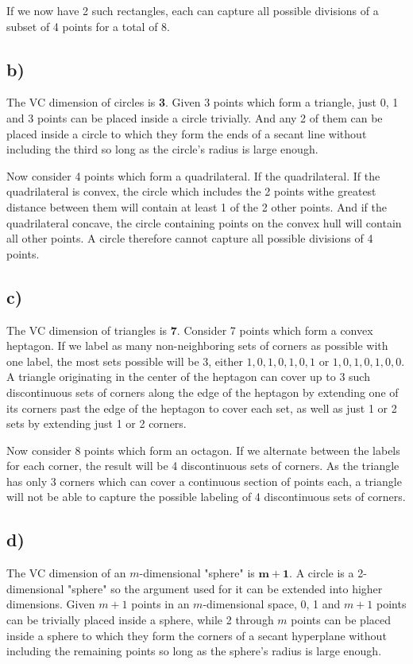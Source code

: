 \documentclass[12pt]{article}
\begin{document}
If we now have 2 such rectangles, each can capture all possible divisions of a subset of 4 points for a total of 8.

\subsection*{b)}
The VC dimension of circles is \textbf{3}. Given 3 points which form a triangle, just 0, 1 and 3 points can be placed inside a circle trivially. And any 2 of them can be placed inside a circle to which they form the ends of a secant line without including the third so long as the circle's radius is large enough.

Now consider 4 points which form a quadrilateral. If the quadrilateral. If the quadrilateral is convex, the circle which includes the 2 points withe greatest distance between them will contain at least 1 of the 2 other points. And if the quadrilateral concave, the circle containing points on the convex hull will contain all other points. A circle therefore cannot capture all possible divisions of 4 points.

\subsection*{c)}
The VC dimension of triangles is \textbf{7}. Consider 7 points which form a convex heptagon. If we label as many non-neighboring sets of corners as possible with one label, the most sets possible will be 3, either $1,0,1,0,1,0,1$ or $1,0,1,0,1,0,0$. A triangle originating in the center of the heptagon can cover up to 3 such discontinuous sets of corners along the edge of the heptagon by extending one of its corners past the edge of the heptagon to cover each set, as well as just 1 or 2 sets by extending just 1 or 2 corners.

Now consider 8 points which form an octagon. If we alternate between the labels for each corner, the result will be 4 discontinuous sets of corners. As the triangle has only 3 corners which can cover a continuous section of points each, a triangle will not be able to capture the possible labeling of 4 discontinuous sets of corners.

\subsection*{d)}
The VC dimension of an $m$-dimensional "sphere" is $\mathbf{m+1}$. A circle is a 2-dimensional "sphere" so the argument used for it can be extended into higher dimensions. Given $m+1$ points in an $m$-dimensional space, 0, 1 and $m+1$ points can be trivially placed inside a sphere, while 2 through $m$ points can be placed inside a sphere to which they form the corners of a secant hyperplane without including the remaining points so long as the sphere's radius is large enough.
\end{document}
